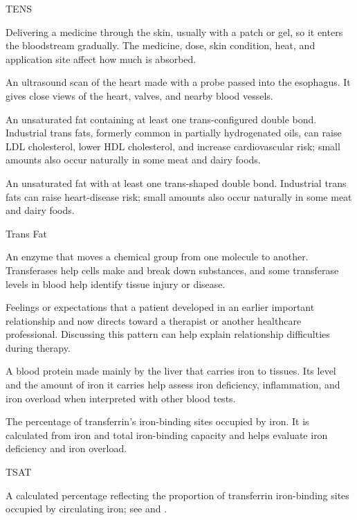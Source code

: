 \synonyms
TENS

 Delivering a medicine through the skin, usually with a patch or gel, so it enters the bloodstream gradually. The medicine, dose, skin condition, heat, and application site affect how much is absorbed.

 An ultrasound scan of the heart made with a probe passed into the esophagus. It gives close views of the heart, valves, and nearby blood vessels.

 An unsaturated fat containing at least one trans-configured double bond. Industrial trans fats, formerly common in partially hydrogenated oils, can raise LDL cholesterol, lower HDL cholesterol, and increase cardiovascular risk; small amounts also occur naturally in some meat and dairy foods.

 An unsaturated fat with at least one trans-shaped double bond. Industrial trans fats can raise heart-disease risk; small amounts also occur naturally in some meat and dairy foods.

\synonyms
Trans Fat

 An enzyme that moves a chemical group from one molecule to another. Transferases help cells make and break down substances, and some transferase levels in blood help identify tissue injury or disease.

 Feelings or expectations that a patient developed in an earlier important relationship and now directs toward a therapist or another healthcare professional. Discussing this pattern can help explain relationship difficulties during therapy.

 A blood protein made mainly by the liver that carries iron to tissues. Its level and the amount of iron it carries help assess iron deficiency, inflammation, and iron overload when interpreted with other blood tests.

 The percentage of transferrin's iron-binding sites occupied by iron. It is calculated from iron and total iron-binding capacity and helps evaluate iron deficiency and iron overload.

\synonyms
TSAT

 A calculated percentage reflecting the proportion of transferrin iron-binding sites occupied by circulating iron; see  and .

